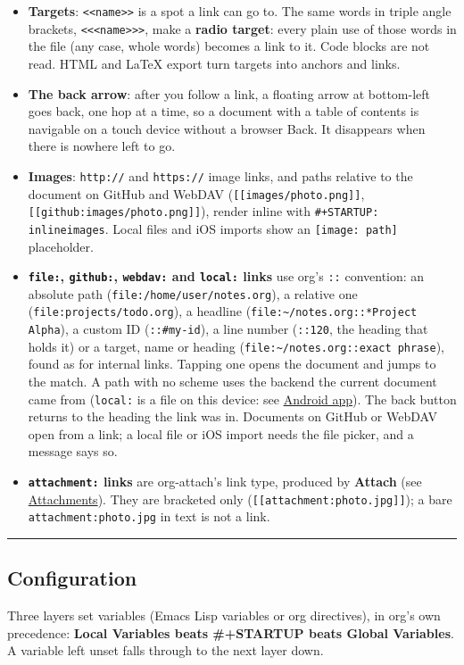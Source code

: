\documentclass[11pt]{article}
\begin{document}
\begin{itemize}
\item \textbf{Targets}: \texttt{<{}<{}name>{}>{}} is a spot a link can go to. The same words in triple angle brackets, \texttt{<{}<{}<name>{}>{}>}, make a \textbf{radio target}: every plain use of those words in the file (any case, whole words) becomes a link to it. Code blocks are not read. HTML and \LaTeX{} export turn targets into anchors and links.
\item \textbf{The back arrow}: after you follow a link, a floating arrow at bottom-left goes back, one hop at a time, so a document with a table of contents is navigable on a touch device without a browser Back. It disappears when there is nowhere left to go.
\item \textbf{Images}: \texttt{http://} and \texttt{https://} image links, and paths relative to the document on GitHub and WebDAV (\texttt{[[images/photo.png]]}, \texttt{[[github:images/photo.png]]}), render inline with \texttt{\#+STARTUP: inlineimages}. Local files and iOS imports show an \texttt{[image: path]} placeholder.
\item \textbf{\texttt{file:}, \texttt{github:}, \texttt{webdav:} and \texttt{local:} links} use org's \texttt{::} convention: an absolute path (\texttt{file:/home/user/notes.org}), a relative one (\texttt{file:projects/todo.org}), a headline (\texttt{file:\textasciitilde{}/notes.org::*Project Alpha}), a custom ID (\texttt{::\#my-id}), a line number (\texttt{::120}, the heading that holds it) or a target, name or heading (\texttt{file:\textasciitilde{}/notes.org::exact phrase}), found as for internal links. Tapping one opens the document and jumps to the match. A path with no scheme uses the backend the current document came from (\texttt{local:} is a file on this device: see \hyperref[sec:org5b8e0d4]{Android app}). The back button returns to the heading the link was in. Documents on GitHub or WebDAV open from a link; a local file or iOS import needs the file picker, and a message says so.
\item \textbf{\texttt{attachment:} links} are org-attach's link type, produced by \textbf{Attach} (see \hyperref[sec:org970e59b]{Attachments}). They are bracketed only (\texttt{[[attachment:photo.jpg]]}); a bare \texttt{attachment:photo.jpg} in text is not a link.
\end{itemize}

\noindent\rule{\textwidth}{0.5pt}

\subsection{Configuration}
\label{sec:orgc6e574d}
Three layers set variables (Emacs Lisp variables or org directives), in org's own precedence: \textbf{Local Variables beats \#+STARTUP beats Global Variables}. A variable left unset falls through to the next layer down.
\end{document}
